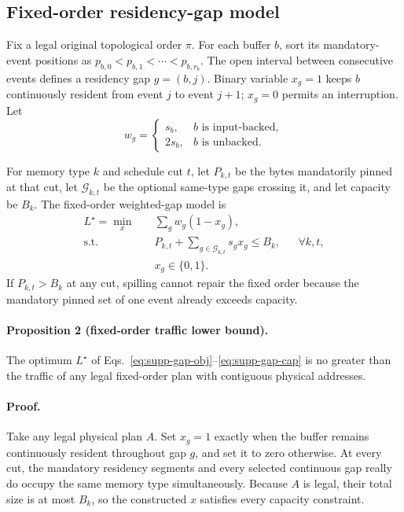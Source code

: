 \subsection{Fixed-order residency-gap model}

Fix a legal original topological order $\pi$. For each buffer $b$, sort its mandatory-event positions as $p_{b,0}<p_{b,1}<\cdots<p_{b,r_b}$. The open interval between consecutive events defines a residency gap $g=(b,j)$. Binary variable $x_g=1$ keeps $b$ continuously resident from event $j$ to event $j+1$; $x_g=0$ permits an interruption. Let
\begin{equation}
 w_g=\begin{cases}
 s_b,&b\text{ is input-backed},\\
 2s_b,&b\text{ is unbacked}.
 \end{cases}
\end{equation}

For memory type $k$ and schedule cut $t$, let $P_{k,t}$ be the bytes mandatorily pinned at that cut, let $\mathcal G_{k,t}$ be the optional same-type gaps crossing it, and let capacity be $B_k$. The fixed-order weighted-gap model is
\begin{align}
 L^\star=\min_x\quad &\sum_g w_g(1-x_g),\label{eq:supp-gap-obj}\\
 \text{s.t.}\quad &P_{k,t}+\sum_{g\in\mathcal G_{k,t}}s_gx_g\le B_k,
 &&\forall k,t,\label{eq:supp-gap-cap}\\
 &x_g\in\{0,1\}.\nonumber
\end{align}
If $P_{k,t}>B_k$ at any cut, spilling cannot repair the fixed order because the mandatory pinned set of one event already exceeds capacity.

\paragraph{Proposition 2 (fixed-order traffic lower bound).}
The optimum $L^\star$ of Eqs.~\eqref{eq:supp-gap-obj}--\eqref{eq:supp-gap-cap} is no greater than the traffic of any legal fixed-order plan with contiguous physical addresses.

\paragraph{Proof.}
Take any legal physical plan $A$. Set $x_g=1$ exactly when the buffer remains continuously resident throughout gap $g$, and set it to zero otherwise. At every cut, the mandatory residency segments and every selected continuous gap really do occupy the same memory type simultaneously. Because $A$ is legal, their total size is at most $B_k$, so the constructed $x$ satisfies every capacity constraint.

